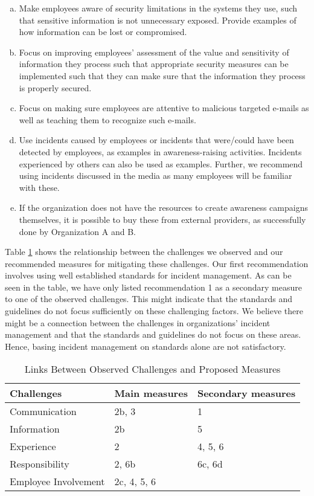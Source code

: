 \begin{enumerate}
\begin{enumerate}[a)]
\item Make employees aware of security limitations in the systems they use, such that sensitive information is not unnecessary exposed. Provide examples of how information can be lost or compromised.
\item Focus on improving employees' assessment of the value and sensitivity of information they process such that appropriate security measures can be implemented such that they can make sure that the information they process is properly secured. 
\item Focus on making sure employees are attentive to malicious targeted e-mails as well as teaching them to recognize such e-mails.
\item Use incidents caused by employees or incidents that were/could have been detected by employees, as examples in awareness-raising activities. Incidents experienced by others can also be used as examples. Further, we recommend using incidents discussed in the media as many employees will be familiar with these. 
\item If the organization does not have the resources to create awareness campaigns themselves, it is possible to buy these from external providers, as successfully done by Organization A and B.
\end{enumerate}
\end{enumerate}

Table \ref{tab:challengesAndMeasures} shows the relationship between the challenges we observed and our recommended measures for mitigating these challenges. Our first recommendation involves using well established standards for incident management. As can be seen in the table, we have only listed recommendation 1 as a secondary measure to one of the observed challenges. This might indicate that the standards and guidelines do not focus sufficiently on these challenging factors. We believe there might be a connection between the challenges in organizations' incident management and that the standards and guidelines do not focus on these areas. Hence, basing incident management on standards alone are not satisfactory.

\begin{table}[H]
\begin{center}
\begin{tabular}{| l | l | l |}
\hline
  \textbf{Challenges} & \textbf{Main measures} & \textbf{Secondary measures} \\
  \hline
  Communication & 2b, 3 & 1 \\
  \hline
  Information & 2b & 5 \\
  \hline
  Experience & 2 & 4, 5, 6 \\
  \hline
  Responsibility & 2, 6b & 6c, 6d \\
  \hline
  Employee Involvement & 2c, 4, 5, 6 &  \\
\hline
\end{tabular}
\label{tab:challengesAndMeasures}
\caption{Links Between Observed Challenges and Proposed Measures}
\end{center}
\end{table}

